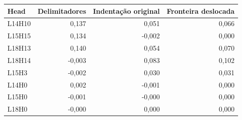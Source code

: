 \begin{tabular}{lrrr}
\toprule
Head & Delimitadores & Indentação original & Fronteira deslocada \\
\midrule
L14H10 & 0,137 & 0,051 & 0,066 \\
L15H15 & 0,134 & -0,002 & 0,000 \\
L18H13 & 0,140 & 0,054 & 0,070 \\
L18H14 & -0,003 & 0,083 & 0,102 \\
L15H3 & -0,002 & 0,030 & 0,031 \\
L14H0 & 0,002 & -0,001 & 0,000 \\
L15H0 & -0,001 & -0,000 & 0,000 \\
L18H0 & -0,000 & 0,000 & 0,000 \\
\bottomrule
\end{tabular}
